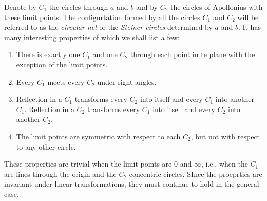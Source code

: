 Denote by $C_1$ the circles through $a$ and $b$ and by $C_2$ the circles of Apollonius with these limit points. The configurtation formed by all the circles $C_1$ and $C_2$ will be referred to as the \emph{circular net} or the \emph{Steiner circles} determined by $a$ and $b$. It has many interesting properties of which we shall list a few:
\begin{enumerate}
	\item There is exactly one $C_1$ and one $C_2$ through each point in te plane with the exception of the limit points.
	\item Every $C_1$ meets every $C_2$ under right angles.
	\item Reflection in a $C_1$ transforms every $C_2$ into itself and every $C_1$ into another $C_1$. Reflection in a $C_2$ transforms every $C_1$ into itself and every $C_2$ into another $C_2$.
	\item The limit points are symmetric with respect to each $C_2$, but not with respect to any other circle.
\end{enumerate}

These properties are trivial when the limit points are $0$ and $\infty$, i.e., when the $C_1$ are lines through the origin and the $C_2$ concentric circles. SInce the proeprties are invariant under linear transformations, they must continue to hold in the general case.

